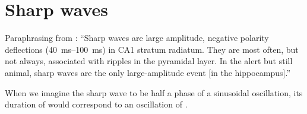 
\section{Sharp waves}


Paraphrasing from : ``Sharp waves are large amplitude, negative polarity deflections (\SIrange{40}{100}{\ms}) in CA1 stratum radiatum. They are most often, but not always, associated with ripples in the pyramidal layer. In the alert but still animal,\footnotemark{} sharp waves are the only large-amplitude event [in the hippocampus].''


When we imagine the sharp wave to be half a phase of a sinusoidal oscillation, its duration of  would correspond to an oscillation of .

